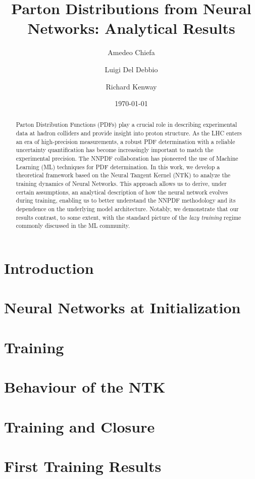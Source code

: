 \documentclass[11pt]{article}
\title{Parton Distributions from Neural Networks: Analytical Results}
\author{Amedeo Chiefa}
\author{Luigi Del Debbio}
\author{Richard Kenway}
\affil{Higgs Centre for Theoretical Physics, School of Physics and Astronomy,
Peter~Guthrie~Tait~Road, Edinburgh EH9 3FD, United Kingdom.}
\date{\today}
\begin{document}
\maketitle

\begin{abstract}
  Parton Distribution Functions (PDFs) play a crucial role in describing
  experimental data at hadron colliders and provide insight into proton
  structure. As the LHC enters an era of high-precision measurements, a robust
  PDF determination with a reliable uncertainty quantification has become
  increasingly important to match the experimental precision. The NNPDF
  collaboration has pioneered the use of Machine Learning (ML) techniques for PDF
  determination. In this work, we develop a theoretical framework based on the
  Neural Tangent Kernel (NTK) to analyze the training dynamics of Neural
  Networks. This approach allows us to derive, under certain assumptions, an
  analytical description of how the neural network evolves during training,
  enabling us to better understand the NNPDF methodology and its dependence on
  the underlying model architecture. Notably, we demonstrate that our results
  contrast, to some extent, with the standard picture of the \textit{lazy training}
  regime commonly discussed in the ML community.
\end{abstract}

\section{Introduction}
\label{sec:intro}



\section{Neural Networks at Initialization}
\label{sec:Init}



\section{Training}
\label{sec:Training}


\section{Behaviour of the NTK}
\label{sec:NTKPheno}


\section{Training and Closure}
\label{sec:TrainClosure}


\section{First Training Results}
\label{sec:FirstResults}


  


\end{document}

